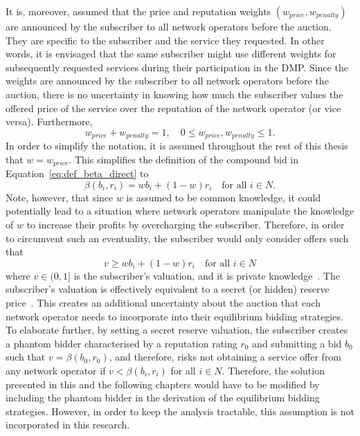 It is, moreover, assumed that the price and reputation weights $(w_{price}, w_{penalty})$ are announced by the subscriber to all network operators before the auction. They are specific to the subscriber and the service they requested. In other words, it is envisaged that the same subscriber might use different weights for subsequently requested services during their participation in the DMP. Since the weights are announced by the subscriber to all network operators before the auction, there is no uncertainty in knowing how much the subscriber values the offered price of the service over the reputation of the network operator (or vice versa). Furthermore,
\begin{equation}
	w_{price} + w_{penalty} = 1,\quad 0\le w_{price},w_{penalty} \le 1.
\end{equation}
In order to simplify the notation, it is assumed throughout the rest of this thesis that $w=w_{price}$. This simplifies the definition of the compound bid in Equation~\eqref{eq:def_beta_direct} to
\begin{equation}
  \beta(b_i, r_i) = wb_i + (1-w)r_i\quad\text{for all } i\in N.
\end{equation}
Note, however, that since $w$ is assumed to be common knowledge, it could potentially lead to a situation where network operators manipulate the knowledge of $w$ to increase their profits by overcharging the subscriber. Therefore, in order to circumvent such an eventuality, the subscriber would only consider offers such that
\begin{equation}
	\label{eq:subscribers_valuation_direct}
	v\geq wb_i + (1-w)r_i \quad\text{for all } i\in N
\end{equation}
where $v\in (0,1]$ is the subscriber's valuation, and it is private knowledge~\cite{DMLeBodic00}. The subscriber's valuation is effectively equivalent to a secret (or hidden) reserve price~\cite{Vincent1995575,LiPerrigne1999,BajariHortacsu2003}. This creates an additional uncertainty about the auction that each network operator needs to incorporate into their equilibrium bidding strategies. To elaborate further, by setting a secret reserve valuation, the subscriber creates a phantom bidder characterised by a reputation rating $r_0$ and submitting a bid $b_0$ such that $v=\beta(b_0,r_0)$, and therefore, risks not obtaining a service offer from any network operator if $v < \beta(b_i,r_i)$ for all $i\in N$. Therefore, the solution presented in this and the following chapters would have to be modified by including the phantom bidder in the derivation of the equilibrium bidding strategies. However, in order to keep the analysis tractable, this assumption is not incorporated in this research.
	
